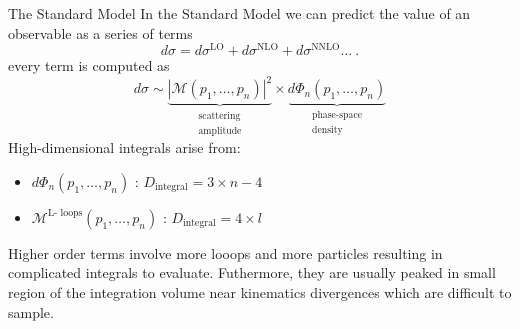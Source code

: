 \documentclass[t,handout,professionalfont,serif]{beamer}
\begin{document}

\begin{frame}{The Standard Model}
	\scriptsize
	In the Standard Model we can predict the value of an observable as a series of terms
	\begin{equation}
		d\sigma = d\sigma^{\text{LO}} + d\sigma^{\text{NLO}} + d\sigma^{\text{NNLO}} \dots  \ .
	\end{equation}
every term is computed as
\begin{equation}
	d\sigma \sim \underbrace{|\mathcal{M}(p_1,\dots, p_n)|^2}_{\substack{\text{scattering} \\ \text{amplitude}}} \times \underbrace{d\Phi_n(p_1,\dots, p_n)}_{\substack{\text{phase-space}\\ \text{density}}}  
\end{equation}
High-dimensional integrals arise from:
\begin{itemize}
	\item  $d\Phi_n(p_1,\dots, p_n) $  :  $D_\text{integral} = 3 \times n - 4$ 
	\item $\mathcal{M}^{\text{L- loops}}(p_1,\dots, p_n)$ :  $D_\text{integral} = 4 \times l$ 
\end{itemize}
\vspace{0.5cm}

Higher order terms involve more looops and more particles resulting in complicated integrals to evaluate. Futhermore, they are usually peaked in small region of the integration volume near kinematics divergences which are difficult to sample.
\end{frame}
\end{document}
